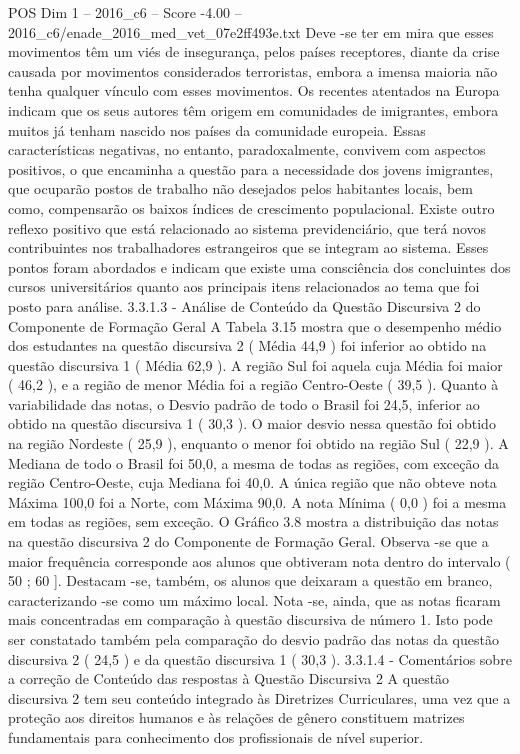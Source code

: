 \begin{textsample}{POS Dim 1 – 2016\_c6 – Score -4.00 – 2016\_c6/enade\_2016\_med\_vet\_07e2ff493e.txt}
Deve -se ter em mira que esses movimentos têm um viés de insegurança, pelos países receptores, diante da crise causada por movimentos considerados terroristas, embora a imensa maioria não tenha qualquer vínculo com esses movimentos.
Os recentes atentados na Europa indicam que os seus autores têm origem em comunidades de imigrantes, embora muitos já tenham nascido nos países da comunidade europeia.
Essas características negativas, no entanto, paradoxalmente, convivem com aspectos positivos, o que encaminha a questão para a necessidade dos jovens imigrantes, que ocuparão postos de trabalho não desejados pelos habitantes locais, bem como, compensarão os baixos índices de crescimento populacional.
Existe outro reflexo positivo que está relacionado ao sistema previdenciário, que terá novos contribuintes nos trabalhadores estrangeiros que se integram ao sistema.
Esses pontos foram abordados e indicam que existe uma consciência dos concluintes dos cursos universitários quanto aos principais itens relacionados ao tema que foi posto para análise. 3.3.1.3 - Análise de Conteúdo da Questão Discursiva 2 do Componente de Formação Geral A Tabela 3.15 mostra que o desempenho médio dos estudantes na questão discursiva 2 ( Média 44,9 ) foi inferior ao obtido na questão discursiva 1 ( Média 62,9 ).
A região Sul foi aquela cuja Média foi maior ( 46,2 ), e a região de menor Média foi a região Centro-Oeste ( 39,5 ).
Quanto à variabilidade das notas, o Desvio padrão de todo o Brasil foi 24,5, inferior ao obtido na questão discursiva 1 ( 30,3 ).
O maior desvio nessa questão foi obtido na região Nordeste ( 25,9 ), enquanto o menor foi obtido na região Sul ( 22,9 ).
A Mediana de todo o Brasil foi 50,0, a mesma de todas as regiões, com exceção da região Centro-Oeste, cuja Mediana foi 40,0.
A única região que não obteve nota Máxima 100,0 foi a Norte, com Máxima 90,0.
A nota Mínima ( 0,0 ) foi a mesma em todas as regiões, sem exceção.
O Gráfico 3.8 mostra a distribuição das notas na questão discursiva 2 do Componente de Formação Geral.
Observa -se que a maior frequência corresponde aos alunos que obtiveram nota dentro do intervalo ( 50 ; 60 ].
Destacam -se, também, os alunos que deixaram a questão em branco, caracterizando -se como um máximo local.
Nota -se, ainda, que as notas ficaram mais concentradas em comparação à questão discursiva de número 1.
Isto pode ser constatado também pela comparação do desvio padrão das notas da questão discursiva 2 ( 24,5 ) e da questão discursiva 1 ( 30,3 ). 3.3.1.4 - Comentários sobre a correção de Conteúdo das respostas à Questão Discursiva 2 A questão discursiva 2 tem seu conteúdo integrado às Diretrizes Curriculares, uma vez que a proteção aos direitos humanos e às relações de gênero constituem matrizes fundamentais para conhecimento dos profissionais de nível superior.

\end{textsample}
